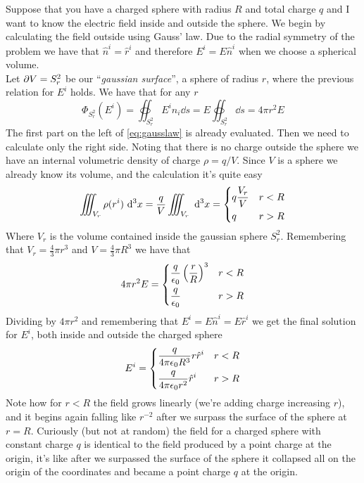 \documentclass[../electromagnetism]{subfiles}
\begin{document}
\begin{eg}
	Suppose that you have a charged sphere with radius $R$ and total charge $q$ and I want to know the electric field inside and outside the sphere. We begin by calculating the field outside using Gauss' law. Due to the radial symmetry of the problem we have that $\hat{n}^i=\hat{r}^i$ and therefore $E^i=E\hat{n}^i$ when we choose a spherical volume.\\
	Let $\partial V=S_r^2$ be our ``\textit{gaussian surface}'', a sphere of radius $r$, where the previous relation for $E^i$ holds. We have that for any $r$
	\begin{equation}
		\Phi_{S^2_r}\left( E^i \right)=\oiint_{S^2_r}E^i\hat{n}_i\dd s=E\oiint_{S_r^2}\dd s=4\pi r^2E
		\label{eq:efluxsphere}
	\end{equation}
	The first part on the left of \eqref{eq:gausslaw} is already evaluated. Then we need to calculate only the right side. Noting that there is no charge outside the sphere we have an internal volumetric density of charge $\rho=q/V$. Since $V$ is a sphere we already know its volume, and the calculation it's quite easy
	\begin{equation}
		\iiint_{V_r}\rho(r^i)\ \mathrm{d}^3x=\frac{q}{V}\iiint_{V_r}\ \mathrm{d}^3x=\begin{dcases}
			q\frac{V_r}{V}&r<R\\
			q&r>R
		\end{dcases}
		\label{eq:charge}
	\end{equation}
	Where $V_r$ is the volume contained inside the gaussian sphere $S^2_r$. Remembering that $V_r=\frac{4}{3}\pi r^3$ and $V=\frac{4}{3}\pi R^3$ we have that
	\begin{equation}
		4\pi r^2E=\begin{dcases}
			\frac{q}{\epsilon_0}\left( \frac{r}{R} \right)^3&r<R\\
			\frac{q}{\epsilon_0}&r>R
		\end{dcases}
		\label{eq:almostsol}
	\end{equation}
	Dividing by $4\pi r^2$ and remembering that $E^i=E\hat{n}^i=E\hat{r}^i$ we get the final solution for $E^i$, both inside and outside the charged sphere
	\begin{equation}
		E^i=\begin{dcases}
			\frac{q}{4\pi\epsilon_0 R^3}r\hat{r}^i&r<R\\
			\frac{q}{4\pi\epsilon_0 r^2}\hat{r}^i&r>R
		\end{dcases}
		\label{eq:eqsphere}
	\end{equation}
	Note how for $r<R$ the field grows linearly (we're adding charge increasing $r$), and it begins again falling like $r^{-2}$ after we surpass the surface of the sphere at $r=R$. Curiously (but not at random) the field for a charged sphere with constant charge $q$ is identical to the field produced by a point charge at the origin, it's like after we surpassed the surface of the sphere it collapsed all on the origin of the coordinates and became a point charge $q$ at the origin.
\end{eg}
\end{document}
